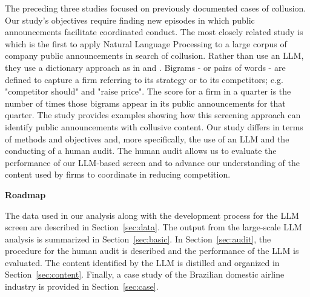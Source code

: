 The preceding three studies focused on previously documented cases of
collusion. Our study's objectives require finding new episodes in which 
public announcements facilitate coordinated conduct. The most 
closely related study is
\textcite{duso2025public} which is the first to apply
Natural Language Processing to a large corpus of company public
announcements in search of collusion. Rather than use an LLM, they use a
dictionary approach as in \textcite{aryal2022coordinated} and \textcite{sheng2024public}.
Bigrams - or pairs of words - are defined to capture a firm referring to its
strategy or to its competitors; e.g. "competitor should" and "raise price".
The score for a firm in a quarter is the number of times those bigrams
appear in its public announcements for that quarter. The study provides
examples showing how this screening approach can identify public
announcements with collusive content. Our study differs in terms of methods 
and objectives and, more specifically, the use of an LLM and the conducting 
of a human audit. The human audit allows us to evaluate the performance of 
our LLM-based screen and to advance our 
understanding of the content used by firms to coordinate in reducing competition. 
\medskip

\textbf{Roadmap }

The data used in our analysis along with the development process for the LLM 
screen are described in Section~\ref{sec:data}. The output from the large-scale LLM analysis 
is summarized in Section~\ref{sec:basic}. In Section~\ref{sec:audit}, the procedure for the human audit is 
described and the performance of the LLM is evaluated. The content identified 
by the LLM is distilled and organized in Section~\ref{sec:content}. Finally, a case study of the Brazilian domestic airline industry
is provided in Section~\ref{sec:case}.
